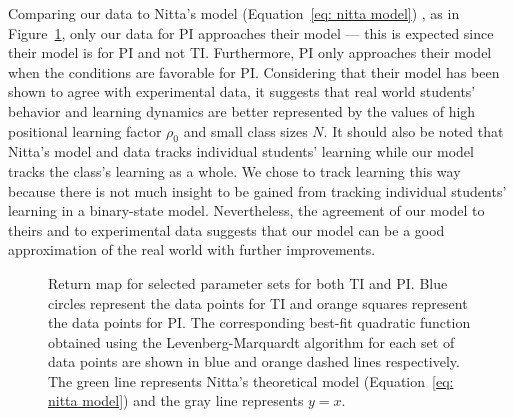 \documentclass[twocolumn,secnumarabic,amssymb, nobibnotes, aps, prd]{revtex4-2}
\begin{document}
        Comparing our data to Nitta's model (Equation~\ref{eq: nitta model}) \cite{nitta2019mathematical}, as in Figure~\ref{fig:Return map}, only our data for PI approaches their model --- this is expected since their model is for PI and not TI.
        Furthermore, PI only approaches their model when the conditions are favorable for PI.
        Considering that their model has been shown to agree with experimental data, it suggests that real world students' behavior and learning dynamics are better represented by the values of high positional learning factor $\rho_0$ and small class sizes $N$.
        It should also be noted that Nitta's model and data tracks individual students' learning while our model tracks the class's learning as a whole.
        We chose to track learning this way because there is not much insight to be gained from tracking individual students' learning in a binary-state model.
        Nevertheless, the agreement of our model to theirs and to experimental data suggests that our model can be a good approximation of the real world with further improvements.

        \begin{figure}[htbp!]
            \centering
            \caption{Return map for selected parameter sets for both TI and PI.
            Blue circles represent the data points for TI and orange squares represent the data points for PI.
            The corresponding best-fit quadratic function obtained using the Levenberg-Marquardt algorithm for each set of data points are shown in blue and orange dashed lines respectively.
            The green line represents Nitta's theoretical model (Equation~\ref{eq: nitta model}) and the gray line represents $y=x$.}
            \label{fig:Return map}
        \end{figure}
        
\end{document}
